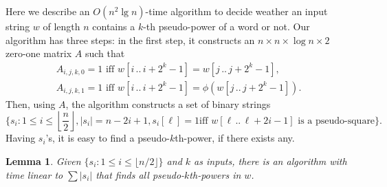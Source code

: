 \documentclass[12pt]{article}
\newtheorem{lemma}[theorem]{Lemma}
\begin{document}
    Here we describe an $O(n^2 \lg n)$-time algorithm to decide weather an input string $w$ of length $n$
    contains a $k$-th pseudo-power of a word or not.
Our algorithm has three steps: in the first step, it constructs an $n\times n\times\log
    n\times2$ zero-one matrix $A$ such that
    \[
      \begin{array}{l}
      A_{i, j, k, 0} = 1 \textrm{ iff } w[i\,..\, i+2^k-1] = w[j\,..\, j+2^k-1],\\
      A_{i, j, k, 1} = 1 \textrm{ iff } w[i\,..\, i+2^k-1] = \phi(w[j\,..\, j+2^k-1]).
      \end{array}
    \]
Then, using $A$, the algorithm constructs a set of binary strings
    \[\{s_i: 1\leq i \leq \left\lfloor \frac n 2\right\rfloor, |s_i|=n-2i+1, s_i[\ell]=1 \textrm{
    iff } w[\ell\,..\, \ell+2i-1] \textrm{ is a pseudo-square}\}.\]
Having $s_i$'s, it is easy to find a pseudo-$k$th-power, if there exists any.
    \begin{lemma}\label{lem:two-to-k}
      Given $\{s_i:1\leq i\leq \lfloor n/2\rfloor\}$ and $k$ as inputs, there is an algorithm with
      time linear to $\sum|s_i|$ that finds {\em all} pseudo-$k$th-powers in $w$.
    \end{lemma}
\end{document}
